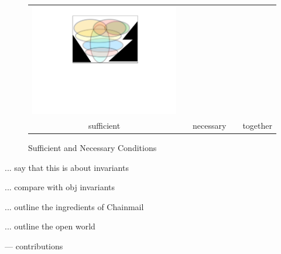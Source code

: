 \begin{figure}[htb]
\begin{tabular}{ccccc}
\begin{minipage}{0.25\textwidth}
 \includegraphics[width=\linewidth, trim=250  320 260 60,clip]{diagrams/NecAndSuff.pdf}
\end{minipage}
\\
sufficient & & necessary & & together
 \end{tabular}
  \vspace*{-4.5mm}
 \label{fig:NecessaryAndSuff}
  \caption{Sufficient and Necessary Conditions}
 \end{figure}

... say that this is about invariants

... compare with obj invariants

... outline the ingredients of Chainmail

... outline the open world

--- contributions

